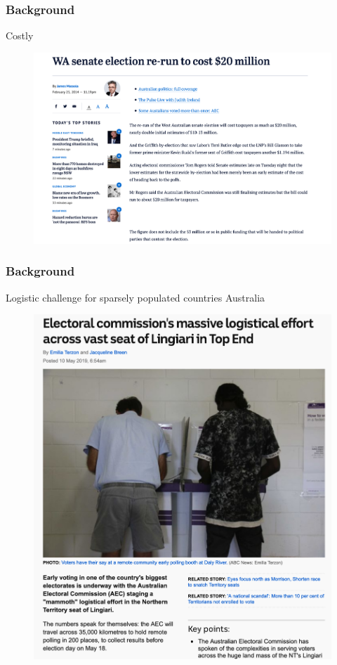 \documentclass{beamer}
\begin{document}
\begin{frame}
\frametitle{Background}
{Costly}
\begin{figure}
	\begin{center}
	\includegraphics[scale=0.25]{re-election.png}
	\end{center}
  \end{figure} 
\end{frame}


\begin{frame}
\frametitle{Background}
{Logistic challenge for sparsely populated countries Australia }
\begin{figure}
	\begin{center}
	\includegraphics[scale=0.20]{logistic.png}
	\end{center}
  \end{figure} 
\end{frame}
\end{document}
